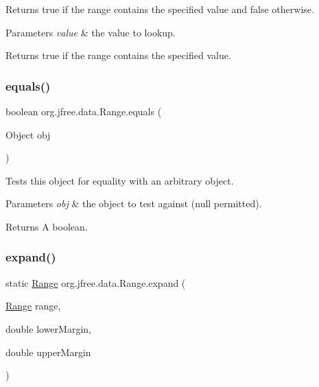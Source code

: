 Returns {\ttfamily true} if the range contains the specified value and {\ttfamily false} otherwise.


\begin{DoxyParams}{Parameters}
{\em value} & the value to lookup.\\
\hline
\end{DoxyParams}
\begin{DoxyReturn}{Returns}
{\ttfamily true} if the range contains the specified value. 
\end{DoxyReturn}
\mbox{\label{classorg_1_1jfree_1_1data_1_1_range_a94f2ce23991a0f78975d4f4c915bae40}} 
\subsubsection{\texorpdfstring{equals()}{equals()}}
{\footnotesize\ttfamily boolean org.\+jfree.\+data.\+Range.\+equals (\begin{DoxyParamCaption}\item[{Object}]{obj }\end{DoxyParamCaption})}

Tests this object for equality with an arbitrary object.


\begin{DoxyParams}{Parameters}
{\em obj} & the object to test against ({\ttfamily null} permitted).\\
\hline
\end{DoxyParams}
\begin{DoxyReturn}{Returns}
A boolean. 
\end{DoxyReturn}
\mbox{\label{classorg_1_1jfree_1_1data_1_1_range_a9c50b697926bf73389dc54f4659c927d}} 
\subsubsection{\texorpdfstring{expand()}{expand()}}
{\footnotesize\ttfamily static \mbox{\hyperlink{classorg_1_1jfree_1_1data_1_1_range}{Range}} org.\+jfree.\+data.\+Range.\+expand (\begin{DoxyParamCaption}\item[{\mbox{\hyperlink{classorg_1_1jfree_1_1data_1_1_range}{Range}}}]{range,  }\item[{double}]{lower\+Margin,  }\item[{double}]{upper\+Margin }\end{DoxyParamCaption})\hspace{0.3cm}{\ttfamily [static]}}

